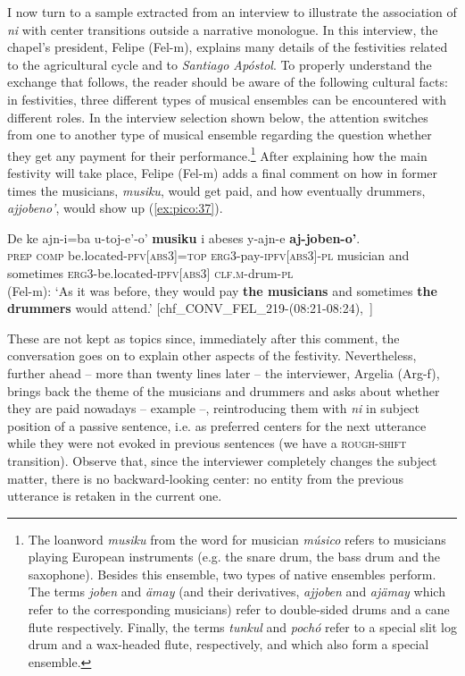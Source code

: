 \documentclass[output=paper
,modfonts
,nonflat]{langsci/langscibook}
\begin{document}
I now turn to a sample extracted from an interview to illustrate the association of \textit{ni} with center transitions outside a narrative monologue. In this interview, the chapel's president, Felipe (Fel-m), explains many details of the festivities related to the agricultural cycle and to \textit {Santiago Apóstol}. To properly understand the exchange that follows, the reader should be aware of the following cultural facts: in  festivities, three different types of musical ensembles can be encountered with different roles. In the interview selection shown below, the attention switches from one to another type of musical ensemble regarding the question whether they get any payment for their performance.\footnote{The loanword \textit{musiku} from the  word for musician \textit{músico} refers to musicians playing European instruments (e.g. the snare drum, the bass drum and the saxophone). Besides this ensemble, two types of native ensembles perform. The terms \textit{joben} and \textit{ämay}  (and their derivatives, \textit{ajjoben} and \textit{ajämay} which refer to the corresponding musicians) refer to double-sided drums and a cane flute respectively. Finally, the terms \textit{tunkul} and \textit{pochó} refer to a special slit log drum and a wax-headed flute, respectively, and which also form a special ensemble.} 
After explaining how the main festivity will take place, Felipe (Fel-m) adds a final comment on how in former times the musicians, \textit{musiku}, would get paid, and how eventually drummers, \textit{ajjobeno'}, would show up (\ref{ex:pico:37}). 


\ea \label{ex:pico:37}

\gll De ke ajn-i=ba u-toj-e'-o' \textbf{musiku} i abeses y-ajn-e \textbf{aj-joben-o'}.\\
\textsc{prep} \textsc{comp} be.located-\textsc{pfv[abs3]}=\textsc{top} {\textsc{erg3}}-pay-{\textsc{ipfv[abs3]}}-{\textsc{pl}} musician and sometimes \textsc{erg3}-be.located-\textsc{ipfv[abs3]} \textsc{clf.m}-drum-\textsc{pl}\\

\glt (Fel-m): `As it was before, they would pay \textbf{the musicians} and sometimes \textbf{the drummers} would attend.' [chf\_CONV\_FEL\_219-(08:21-08:24),~\citealt{Delgado-Galvan2018archive}] 
\z


These are not kept as topics since, immediately after this comment, the conversation goes on to explain other aspects of the festivity. Nevertheless, further ahead -- more than twenty lines later -- the interviewer, Argelia (Arg-f), brings back the theme of the musicians and drummers and asks about whether they are paid nowadays -- example  --, reintroducing them with \textit{ni} in subject position of a passive sentence, i.e. as preferred centers for the next utterance while they were not evoked in previous sentences (we have a \textsc{rough-shift} transition). Observe that, since the interviewer completely changes the subject matter, there is no backward-looking center: no entity from the previous utterance is retaken in the current one.
\end{document}
